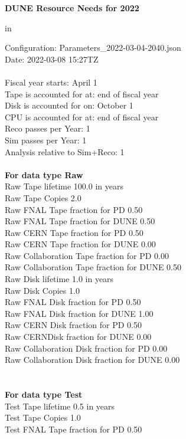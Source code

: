\documentclass[12pt]{article}
\begin{document}
\centerline{\bf{DUNE Resource Needs for 2022}} in \par Configuration: Parameters\_2022-03-04-2040.json\\
  Date: 2022-03-08 15:27TZ\\
   \\
  
 Fiscal year starts: April 1\\ 
Tape is accounted for at: end of fiscal year\\ 
Disk is accounted for on: October 1\\ 
CPU is accounted for at: end of fiscal year\\ 
Reco passes per Year: 1\\
Sim passes per Year: 1\\
Analysis relative to Sim+Reco: 1\\
\pagebreak
\\
{\bf For data type Raw}\\
   Raw Tape lifetime 100.0 in years\\
   Raw Tape Copies   2.0\\
   Raw FNAL Tape fraction for PD  0.50\\
   Raw FNAL Tape fraction for DUNE  0.50\\
   Raw CERN Tape fraction for PD  0.50\\
   Raw CERN Tape fraction for DUNE  0.00\\
   Raw Collaboration Tape fraction for PD  0.00\\
   Raw Collaboration Tape fraction for DUNE  0.50\\
   Raw Disk lifetime   1.0 in years\\
   Raw Disk Copies   1.0\\
   Raw FNAL Disk fraction for PD  0.50\\
   Raw FNAL Disk fraction for DUNE  1.00\\
   Raw CERN Disk fraction for PD  0.50\\
   Raw CERNDisk fraction for DUNE  0.00\\
   Raw Collaboration Disk fraction for PD  0.00\\
   Raw Collaboration Disk fraction for DUNE  0.00\\
\pagebreak\\
\\
{\bf For data type Test}\\
  Test Tape lifetime   0.5 in years\\
  Test Tape Copies   1.0\\
  Test FNAL Tape fraction for PD  0.50\\
\end{document}
